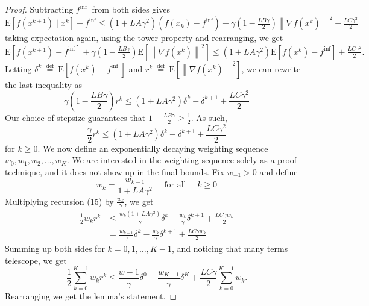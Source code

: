 \documentclass[8pt,a4paper]{article}
\begin{document}
\begin{proof}
	Subtracting $f^{\text {inf }}$ from both sides gives
	$\mathrm{E}\left[f\left(x^{k+1}\right) \mid x^{k}\right]-f^{\mathrm{inf}} \leq\left(1+L A \gamma^{2}\right)\left(f\left(x_{k}\right)-f^{\mathrm{inf}}\right)-\gamma\left(1-\frac{L B \gamma}{2}\right)\left\|\nabla f\left(x^{k}\right)\right\|^{2}+\frac{L C \gamma^{2}}{2}$ taking expectation again, using the tower property and rearranging, we get $\mathrm{E}\left[f\left(x^{k+1}\right)-f^{\inf }\right]+\gamma\left(1-\frac{L B \gamma}{2}\right) \mathrm{E}\left[\left\|\nabla f\left(x^{k}\right)\right\|^{2}\right] \leq\left(1+L A \gamma^{2}\right) \mathrm{E}\left[f\left(x^{k}\right)-f^{\inf }\right]+\frac{L C \gamma^{2}}{2} .$
	Letting $\delta^{k} \stackrel{\text { def }}{=} \mathrm{E}\left[f\left(x^{k}\right)-f^{\text {inf }}\right]$ and $r^{k} \stackrel{\text { def }}{=} \mathrm{E}\left[\left\|\nabla f\left(x^{k}\right)\right\|^{2}\right]$, we can rewrite the last inequality as
	$$
	\gamma\left(1-\frac{L B \gamma}{2}\right) r^{k} \leq\left(1+L A \gamma^{2}\right) \delta^{k}-\delta^{k+1}+\frac{L C \gamma^{2}}{2}
	$$
	Our choice of stepsize guarantees that $1-\frac{L B \gamma}{2} \geq \frac{1}{2}$. As such,
	\begin{equation}
	\frac{\gamma}{2} r^{k} \leq\left(1+L A \gamma^{2}\right) \delta^{k}-\delta^{k+1}+\frac{L C \gamma^{2}}{2}
	\end{equation}
	for $k \geq 0$.
	We now define an exponentially decaying weighting sequence $w_{0}, w_{1}, w_{2}, \ldots, w_{K}$. We are interested in the weighting sequence solely as a proof technique, and it does not show up in the final bounds.
	Fix $w_{-1}>0$ and define
	$$
	w_{k}=\frac{w_{k-1}}{1+L A \gamma^{2}} \quad \text { for all } \quad k \geq 0
	$$
	Multiplying recursion (15) by $\frac{w_{k}}{\gamma}$, we get
	$$
	\begin{aligned}
		\frac{1}{2} w_{k} r^{k} & \leq \frac{w_{k}\left(1+L A \gamma^{2}\right)}{\gamma} \delta^{k}-\frac{w_{k}}{\gamma} \delta^{k+1}+\frac{L C \gamma w_{k}}{2} \\
		&=\frac{w_{k-1}}{\gamma} \delta^{k}-\frac{w_{k}}{\gamma} \delta^{k+1}+\frac{L C \gamma w_{k}}{2}
	\end{aligned}
	$$
	Summing up both sides for $k=0,1, \ldots, K-1$, and noticing that many terms telescope, we get
	$$
	\frac{1}{2} \sum_{k=0}^{K-1} w_{k} r^{k} \leq \frac{w-1}{\gamma} \delta^{0}-\frac{w_{K-1}}{\gamma} \delta^{K}+\frac{L C \gamma}{2} \sum_{k=0}^{K-1} w_{k} .
	$$
	Rearranging we get the lemma's statement.
\end{proof}
\end{document}
